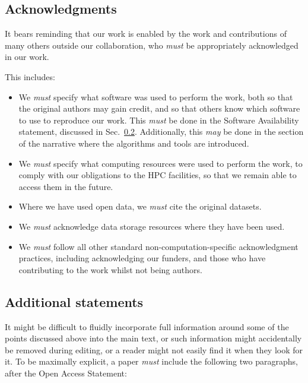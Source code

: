 \documentclass{article}
\newcommand\rfcword[1]{\emph{#1}\xspace}
\newcommand\must{\rfcword{must}}
\newcommand\may{\rfcword{may}}
\begin{document}
\subsection{Acknowledgments}\label{sec:acknowledge}

It bears reminding that our work is enabled by
the work and contributions of many others outside our collaboration,
who \must be appropriately acknowledged in our work.

This includes:

\begin{itemize}
  \item
        We \must specify what software was used to perform the work,
        both so that the original authors may gain credit,
        and so that others know which software to use to reproduce our work.
        This \must be done in the Software Availability statement,
        discussed in Sec.~\ref{sec:statements}.
        Additionally,
        this \may be done
        in the section of the narrative where the algorithms and tools are introduced.
  \item
        We \must specify what computing resources were used to perform the work,
        to comply with our obligations to the HPC facilities,
        so that we remain able to access them in the future.
  \item
        Where we have used open data,
        we \must cite the original datasets.
  \item
        We \must acknowledge data storage resources where they have been used.
  \item
        We \must follow all other standard non-computation-specific acknowledgment practices,
        including acknowledging our funders,
        and those who have contributing to the work whilst not being authors.
\end{itemize}

\subsection{Additional statements}
\label{sec:statements}

It might be difficult to fluidly incorporate
full information around some of the points discussed above into the main text,
or such information might accidentally be removed during editing,
or a reader might not easily find it when they look for it.
To be maximally explicit,
a paper \must include the following two paragraphs,
after the Open Access Statement:
\end{document}
